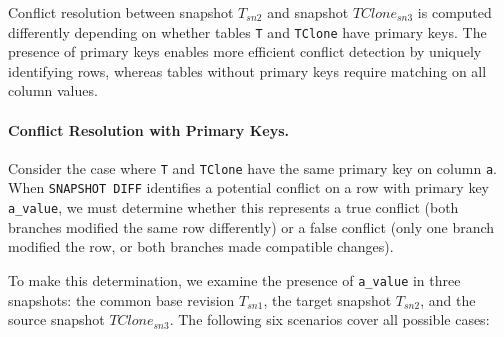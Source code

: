 \documentclass[sigconf,nonacm]{acmart} %
\begin{document}
Conflict resolution between snapshot $T_{sn2}$ and 
snapshot $TClone_{sn3}$ is computed differently depending on whether tables 
\texttt{T} and \texttt{TClone} have primary keys. The presence of primary keys 
enables more efficient conflict detection by uniquely identifying rows, whereas 
tables without primary keys require matching on all column values.

\paragraph{Conflict Resolution with Primary Keys.}
Consider the case where \texttt{T} and \texttt{TClone} have 
the same primary key on column \texttt{a}. When \texttt{SNAPSHOT DIFF}
identifies a potential conflict on a row with primary key \texttt{a\_value}, 
we must determine whether this represents a true conflict (both branches modified 
the same row differently) or a false conflict (only one branch modified the row, 
or both branches made compatible changes). 

To make this determination, we examine the presence of \texttt{a\_value} in three 
snapshots: the common base revision $T_{sn1}$, the target snapshot $T_{sn2}$, 
and the source snapshot $TClone_{sn3}$. The following six scenarios cover all 
possible cases:
\end{document}
